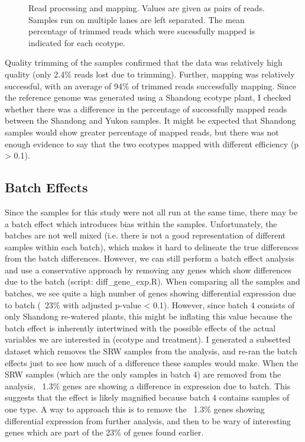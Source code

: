 \documentclass[12pt]{article}
\begin{document}
		\begin{figure}[H]
			\centering
			\scalebox{0.7}{}
			\caption[Read Processing Statistics]{Read processing and mapping. Values are given as pairs of reads. Samples run on multiple lanes are left separated. The mean percentage of trimmed reads which were sucessfully mapped is indicated for each ecotype.}
			\label{read_stats}
		\end{figure}
	
	Quality trimming of the samples confirmed that the data was relatively high quality (only 2.4\% reads lost due to trimming). Further, mapping was relatively successful, with an average of 94\% of trimmed reads successfully mapping. Since the reference genome was generated using a Shandong ecotype plant, I checked whether there was a difference in the percentage of successfully mapped reads between the Shandong and Yukon samples. It might be expected that Shandong samples would show greater percentage of mapped reads, but there was not enough evidence to say that the two ecotypes mapped with different efficiency (p > 0.1). 
	
	
	\subsection{Batch Effects}
	Since the samples for this study were not all run at the same time, there may be a batch effect which introduces bias within the samples. Unfortunately, the batches are not well mixed (i.e. there is not a good representation of different samples within each batch), which makes it hard to delineate the true differences from the batch differences. However, we can still perform a batch effect analysis and use a conservative approach by removing any genes which show differences due to the batch (script: diff\_gene\_exp.R). When comparing all the samples and batches, we see quite a high number of genes showing differential expression due to batch (~23\% with adjusted p-value < 0.1). However, since batch 4 consists of only Shandong re-watered plants, this might be inflating this value because the batch effect is inherently intertwined with the possible effects of the actual variables we are interested in (ecotype and treatment). I generated a subsetted dataset which removes the SRW samples from the analysis, and re-ran the batch effects just to see how much of a difference these samples would make. When the SRW samples (which are the only samples in batch 4) are removed from the analysis, ~1.3\% genes are showing a difference in expression due to batch. This suggests that the effect is likely magnified because batch 4 contains samples of one type. A way to approach this is to remove the ~1.3\% genes showing differential expression from further analysis, and then to be wary of interesting genes which are part of the 23\% of genes found earlier.
	
\end{document}
